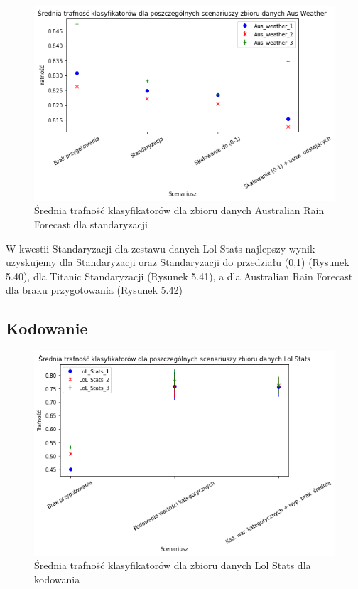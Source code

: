 \documentclass{book}
\begin{document}
\begin{figure}[H]
    \centerline{\includegraphics[scale=0.8]{Aus_Weather_Avg_Standaryzacja}}
    \centering
    \caption{Średnia trafność klasyfikatorów dla zbioru danych Australian Rain Forecast 
    dla standaryzacji}
    \end{figure}

    W kwestii Standaryzacji dla zestawu danych Lol Stats 
    najlepszy wynik uzyskujemy dla Standaryzacji oraz 
    Standaryzacji do przedziału (0,1) (Rysunek 5.40), dla 
    Titanic Standaryzacji (Rysunek 5.41), a dla Australian 
    Rain Forecast dla braku przygotowania (Rysunek 5.42)

\subsection{Kodowanie}

\begin{figure}[H]
    \centerline{\includegraphics[scale=0.8]{Lol_Stats_Avg_Kodowanie}}
    \centering
    \caption{Średnia trafność klasyfikatorów dla zbioru danych Lol Stats 
    dla kodowania}
    \end{figure}
\end{document}
